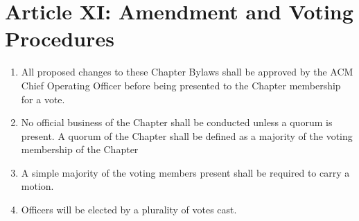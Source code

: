 \section*{Article XI: Amendment and Voting Procedures}

\begin{enumerate}
    \item All proposed changes to these Chapter Bylaws shall be approved by the ACM Chief Operating Officer before being presented to the Chapter membership for a vote.
    \item No official business of the Chapter shall be conducted unless a quorum is present.
    A quorum of the Chapter shall be defined as a majority of the voting membership of the Chapter
    \item A simple majority of the voting members present shall be required to carry a motion.
    \item Officers will be elected by a plurality of votes cast.
\end{enumerate}
